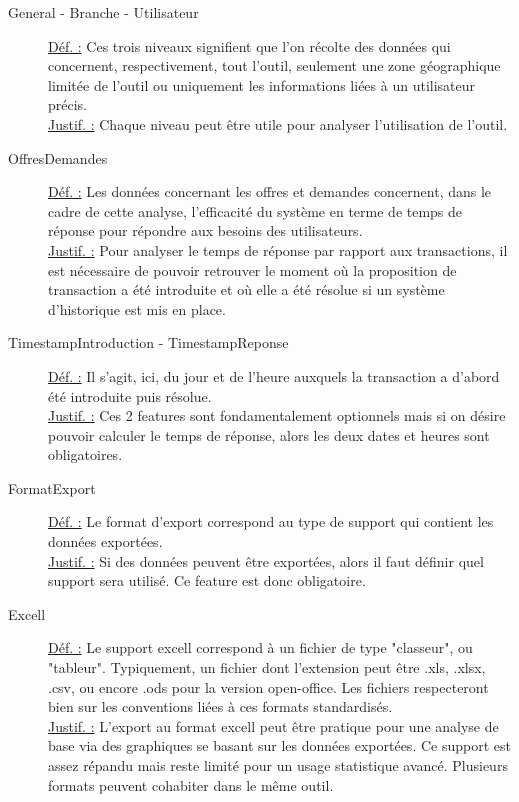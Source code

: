 \begin{description}
\item [General - Branche - Utilisateur]
\underline{Déf. :}  Ces trois niveaux signifient que l'on récolte des données qui concernent,  respectivement,  tout l'outil,  seulement une zone géographique limitée de l'outil ou uniquement les informations liées à un utilisateur précis.
\\ \underline{Justif. :}  Chaque niveau peut être utile pour analyser l'utilisation de l'outil.
\newline

\item [OffresDemandes]
\underline{Déf. :}  Les données concernant les offres et demandes concernent,  dans le cadre de cette analyse,  l'efficacité du système en terme de temps de réponse pour répondre aux besoins des utilisateurs.  
\\ \underline{Justif. :}  Pour analyser le temps de réponse par rapport aux transactions,  il est nécessaire de pouvoir retrouver le moment où la proposition de transaction a été introduite et où elle a été résolue si un système d'historique est mis en place.  
\newline

\item [TimestampIntroduction - TimestampReponse]
\underline{Déf. :}  Il s'agit,  ici,  du jour et de l'heure auxquels la transaction a d'abord été introduite puis résolue.
\\ \underline{Justif. :}  Ces 2 features sont fondamentalement optionnels mais si on désire pouvoir calculer le temps de réponse,  alors les deux dates et heures sont obligatoires.
\newline

\item [FormatExport]
\underline{Déf. :}  Le format d'export correspond au type de support qui contient les données exportées.
\\ \underline{Justif. :}  Si des données peuvent être exportées,  alors il faut définir quel support sera utilisé.  Ce feature est donc obligatoire.
\newline

\item [Excell]
\underline{Déf. :}  Le support excell correspond à un fichier de type "classeur",  ou "tableur".  Typiquement,  un fichier dont l'extension peut être .xls,  .xlsx,  .csv,  ou encore .ods pour la version open-office.  Les fichiers respecteront bien sur les conventions liées à ces formats standardisés.
\\ \underline{Justif. :}  L'export au format excell peut être pratique pour une analyse de base via des graphiques se basant sur les données exportées.  Ce support est assez répandu mais reste limité pour un usage statistique avancé.   Plusieurs formats peuvent cohabiter dans le même outil.
\newline


\end{description}
